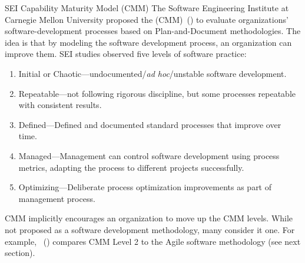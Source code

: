 \begin{elaboration}{SEI Capability Maturity Model (CMM)}
  \protect{}%
  \protect{}%
The Software Engineering Institute at Carnegie Mellon University
proposed the  (CMM)~(\cite{Paulk05})
to evaluate  organizations'
software-development processes based on Plan-and-Document methodologies.
The idea is that by modeling the software development process, an
organization can improve them. SEI studies observed five levels of
software practice:
\begin{enumerate}
\item Initial or Chaotic---undocumented/\emph{ad hoc}/unstable software development.

\item Repeatable---not following rigorous discipline, but some processes repeatable with consistent results.

\item Defined---Defined and documented standard processes that improve over time.

\item Managed---Management can control software development using process metrics, adapting the process to different projects successfully.

\item Optimizing---Deliberate process optimization improvements as part of management process.

\end{enumerate}
CMM implicitly encourages an organization to move up the CMM levels. While not proposed as a software development methodology, many consider it one. For example, ~(\cite{Nawrocki02}) compares CMM Level 2 to the Agile software methodology (see next section).
\end{elaboration}